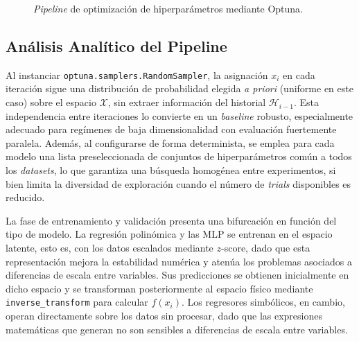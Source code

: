 \documentclass[11pt, a4paper]{article}
\begin{document}
\begin{figure}[H]
{
}
\caption{\textit{Pipeline} de optimización de hiperparámetros mediante Optuna.}
\label{fig:optuna}
\end{figure}

\subsection{Análisis Analítico del Pipeline}

Al instanciar \texttt{optuna.samplers.RandomSampler}, la asignación $x_i$ en cada iteración sigue una distribución de probabilidad elegida \textit{a priori} (uniforme en este caso) sobre el espacio $\mathcal{X}$, sin extraer información del historial $\mathcal{H}_{i-1}$. Esta independencia entre iteraciones lo convierte en un \textit{baseline} robusto, especialmente adecuado para regímenes de baja dimensionalidad con evaluación fuertemente paralela. Además, al configurarse de forma determinista, se emplea para cada modelo una lista preseleccionada de conjuntos de hiperparámetros común a todos los \textit{datasets}, lo que garantiza una búsqueda homogénea entre experimentos, si bien limita la diversidad de exploración cuando el número de \textit{trials} disponibles es reducido.

La fase de entrenamiento y validación presenta una bifurcación en función del tipo de modelo. La regresión polinómica y las MLP se entrenan en el espacio latente, esto es, con los datos escalados mediante $z$-score, dado que esta representación mejora la estabilidad numérica y atenúa los problemas asociados a diferencias de escala entre variables. Sus predicciones se obtienen inicialmente en dicho espacio y se transforman posteriormente al espacio físico mediante \texttt{inverse\_transform} para calcular $f(x_i)$. Los regresores simbólicos, en cambio, operan directamente sobre los datos sin procesar, dado que las expresiones matemáticas que generan no son sensibles a diferencias de escala entre variables.
\end{document}
